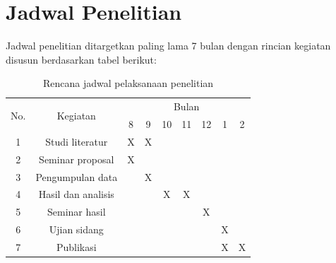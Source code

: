 \section[Jadwal Penelitian]{Jadwal Penelitian}
\begin{spacing}{1.5}
	Jadwal penelitian ditargetkan paling lama 7 bulan dengan rincian kegiatan disusun berdasarkan tabel berikut:
	\begin{table}[htp]
		\centering
		\caption{Rencana jadwal pelaksanaan penelitian}
		\label{table:jadwal}
		\begin{tabular}{|c|c|ccccccc|}
			\hline
			\multirow{2}{*}{No.} & \multirow{2}{*}{Kegiatan} & \multicolumn{7}{c|}{Bulan}                                                                                                                            \\ \cline{3-9} 
			&                   & \multicolumn{1}{c|}{8} & \multicolumn{1}{c|}{9} & \multicolumn{1}{c|}{10} & \multicolumn{1}{c|}{11} & \multicolumn{1}{c|}{12} & \multicolumn{1}{c|}{1} &  2 \\ \hline 1
			& Studi literatur   & \multicolumn{1}{c|}{X} & \multicolumn{1}{c|}{X} & \multicolumn{1}{c|}{} & \multicolumn{1}{c|}{} & \multicolumn{1}{c|}{} & \multicolumn{1}{c|}{} &  \\ \hline 2
			& Seminar proposal    & \multicolumn{1}{c|}{X} & \multicolumn{1}{c|}{} & \multicolumn{1}{c|}{} & \multicolumn{1}{c|}{} & \multicolumn{1}{c|}{} & \multicolumn{1}{c|}{} &  \\ \hline 3
			& Pengumpulan data    & \multicolumn{1}{c|}{} & \multicolumn{1}{c|}{X} & \multicolumn{1}{c|}{} & \multicolumn{1}{c|}{} & \multicolumn{1}{c|}{} & \multicolumn{1}{c|}{} &  \\ \hline 4
			& Hasil dan analisis  & \multicolumn{1}{c|}{} & \multicolumn{1}{c|}{} & \multicolumn{1}{c|}{X} & \multicolumn{1}{c|}{X} & \multicolumn{1}{c|}{} & \multicolumn{1}{c|}{} &  \\ \hline 5
			& Seminar hasil       & \multicolumn{1}{c|}{} & \multicolumn{1}{c|}{} & \multicolumn{1}{c|}{} & \multicolumn{1}{c|}{} & \multicolumn{1}{c|}{X} & \multicolumn{1}{c|}{} &  \\ \hline 6
			& Ujian sidang        & \multicolumn{1}{c|}{} & \multicolumn{1}{c|}{} & \multicolumn{1}{c|}{} & \multicolumn{1}{c|}{} & \multicolumn{1}{c|}{} & \multicolumn{1}{c|}{X} &  \\ \hline 7
			& Publikasi           & \multicolumn{1}{c|}{} & \multicolumn{1}{c|}{} & \multicolumn{1}{c|}{} & \multicolumn{1}{c|}{} & \multicolumn{1}{c|}{} & \multicolumn{1}{c|}{X} & X  \\ \hline 
		\end{tabular}
	\end{table}

\end{spacing}
\vspace{-0.1pc}